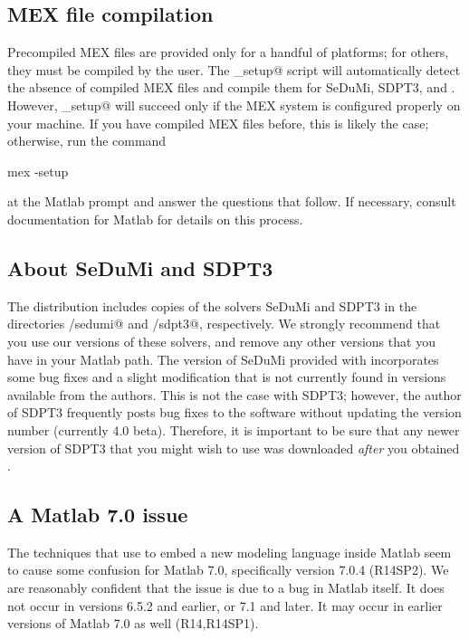 \documentclass[12pt]{article}
\begin{document}
\subsection{MEX file compilation}
\label{sec:othersys}

Precompiled MEX files are provided only for a handful of platforms;
for others, they must be compiled by the user. The \verb@cvx_setup@ script will
automatically detect the absence of compiled MEX files and compile them
for SeDuMi, SDPT3, and \cvx. However, \verb@cvx_setup@ will succeed only
if the MEX system is configured properly on your machine. If you have
compiled MEX files before, this is likely the case; otherwise, run the command
\begin{code}
	mex -setup
\end{code}
at the Matlab prompt and answer the questions that follow. If necessary, consult documentation for
Matlab for details on this process.

\subsection{About SeDuMi and SDPT3}

The \cvx distribution includes copies of the solvers SeDuMi and SDPT3 in
the directories \verb@cvx/sedumi@ and \verb@cvx/sdpt3@, respectively. 
We strongly recommend that you use our versions of these solvers,
and remove any other versions that you have in your Matlab path.
The version of SeDuMi provided with \cvx incorporates some bug fixes
and a slight modification that is not currently found in versions
available from the authors. This is not the case with SDPT3; however,
the author of SDPT3 frequently posts bug fixes to the software without
updating the version number (currently 4.0 beta). Therefore, it is
important to be sure that any newer version of SDPT3 that you might
wish to use was downloaded \emph{after} you obtained \cvx.

\subsection{A Matlab 7.0 issue}
\label{sec:sevenprob}

The techniques that \cvx use to embed a new modeling language inside Matlab
seem to cause some confusion for Matlab 7.0, specifically version 7.0.4 (R14SP2). 
We are reasonably confident
that the issue is due to a bug in Matlab itself. It does not occur in versions
6.5.2 and earlier, or 7.1 and later. It may occur in earlier versions of
Matlab 7.0 as well (R14,R14SP1).
\end{document}
